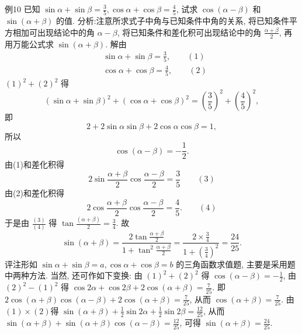 例10 已知 $\sin \alpha+\sin \beta=\frac{3}{5}, \cos \alpha+\cos \beta=\frac{4}{5}$, 试求 $\cos (\alpha-\beta)$ 和 $\sin (\alpha+\beta)$ 的值.
分析:注意所求式子中角与已知条件中角的关系, 将已知条件平方相加可出现结论中的角 $\alpha-\beta$, 将已知条件和差化积可出现结论中的角 $\frac{\alpha+\beta}{2}$, 再用万能公式求 $\sin (\alpha+\beta)$.
解由
$$
\begin{aligned}
& \sin \alpha+\sin \beta=\frac{3}{5}, \quad\quad(1) \\
& \cos \alpha+\cos \beta=\frac{4}{5}, \quad\quad(2) 
\end{aligned}
$$
$(1)^2+(2)^2$ 得
$$
(\sin \alpha+\sin \beta)^2+(\cos \alpha+\cos \beta)^2=\left(\frac{3}{5}\right)^2+\left(\frac{4}{5}\right)^2,
$$
即
$$
2+2 \sin \alpha \sin \beta+2 \cos \alpha \cos \beta=1,
$$
所以
$$
\cos (\alpha-\beta)=-\frac{1}{2} .
$$
由(1)和差化积得
$$
2 \sin \frac{\alpha+\beta}{2} \cos \frac{\alpha-\beta}{2}=\frac{3}{5} \quad\quad(3) 
$$
由(2)和差化积得
$$
2 \cos \frac{\alpha+\beta}{2} \cos \frac{\alpha-\beta}{2}=\frac{4}{5} . \quad\quad(4) 
$$
于是由 $\frac{(3)}{(4)}$ 得 $\tan \frac{(\alpha+\beta)}{2}=\frac{3}{4}$. 故
$$
\sin (\alpha+\beta)=\frac{2 \tan \frac{\alpha+\beta}{2}}{1+\tan ^2 \frac{\alpha+\beta}{2}}=\frac{2 \times \frac{3}{4}}{1+\left(\frac{3}{4}\right)^2}=\frac{24}{25} .
$$
评注形如 $\sin \alpha+\sin \beta=a, \cos \alpha+\cos \beta=b$ 的三角函数求值题, 主要是采用题中两种方法.
当然, 还可作如下变换: 由 $(1 )^2+(2)^2$ 得 $\cos (\alpha-\beta)= -\frac{1}{2}$, 由 $(2)^2-(1)^2$ 得 $\cos 2 \alpha+\cos 2 \beta+2 \cos (\alpha+\beta)=\frac{7}{25}$.
即 $2 \cos (\alpha+\beta) \cos (\alpha-\beta)+2 \cos (\alpha+\beta)=\frac{7}{25}$, 从而 $\cos (\alpha+\beta)=\frac{7}{25}$.
由$(1) \times(2)$得 $\sin (\alpha+\beta)+\frac{1}{2} \sin 2 \alpha+\frac{1}{2} \sin 2 \beta=\frac{12}{25}$, 从而 $\sin (\alpha+\beta)+ \sin (\alpha+\beta) \cos (\alpha-\beta)=\frac{12}{25}$, 可得 $\sin (\alpha+\beta)=\frac{24}{25}$.




